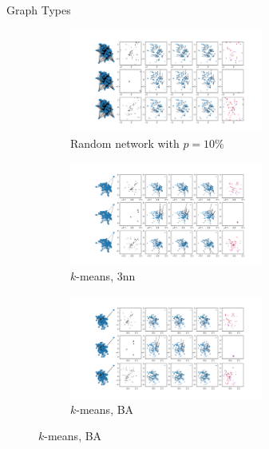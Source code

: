 \documentclass[aspectratio=169]{beamer}
\begin{document}
\begin{frame}[plain]{Graph Types}
\begin{figure}[htbp]
\begin{subfigure}{0.24\textwidth}
            \centering
            \includegraphics[trim={4.8cm 13.2cm 29.3cm 2.4cm},clip,width=0.7\textwidth]{../results/pdfs/rn10-100N-noemb0}
            \caption{Random network with $p=10\%$}
        \end{subfigure}
        \begin{subfigure}{0.24\textwidth}
            \centering
            \includegraphics[trim={4.8cm 13.2cm 29.3cm 2.4cm},clip,width=0.7\textwidth]{../results/pdfs/nn-100N-noemb0}
            \caption{$k$-means, 3nn}
        \end{subfigure}
        \begin{subfigure}{0.24\textwidth}
            \centering
            \includegraphics[trim={4.8cm 13.2cm 29.3cm 2.4cm},clip,width=0.7\textwidth]{../results/pdfs/ba-100N-noemb0}
            \caption{$k$-means, BA}
        \end{subfigure}
    \end{figure}
\end{frame}
\end{document}
